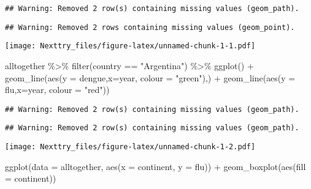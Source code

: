 \documentclass[
]{book}
\newenvironment{Shaded}{\begin{snugshade}}{\end{snugshade}}
\newcommand{\AttributeTok}[1]{\textcolor[rgb]{0.77,0.63,0.00}{#1}}
\newcommand{\FunctionTok}[1]{\textcolor[rgb]{0.00,0.00,0.00}{#1}}
\newcommand{\NormalTok}[1]{#1}
\newcommand{\SpecialCharTok}[1]{\textcolor[rgb]{0.00,0.00,0.00}{#1}}
\newcommand{\StringTok}[1]{\textcolor[rgb]{0.31,0.60,0.02}{#1}}
\begin{document}
\begin{verbatim}
## Warning: Removed 2 row(s) containing missing values (geom_path).
\end{verbatim}

\begin{verbatim}
## Warning: Removed 2 rows containing missing values (geom_point).
\end{verbatim}

\texttt{[image: Nexttry\_files/figure-latex/unnamed-chunk-1-1.pdf]}

\begin{Shaded}
\begin{Highlighting}[]
\NormalTok{alltogether }\SpecialCharTok{\%\textgreater{}\%} \FunctionTok{filter}\NormalTok{(country }\SpecialCharTok{==} \StringTok{"Argentina"}\NormalTok{) }\SpecialCharTok{\%\textgreater{}\%}
  \FunctionTok{ggplot}\NormalTok{() }\SpecialCharTok{+} 
  \FunctionTok{geom\_line}\NormalTok{(}\FunctionTok{aes}\NormalTok{(}\AttributeTok{y =}\NormalTok{ dengue,}\AttributeTok{x=}\NormalTok{year, }\AttributeTok{colour =} \StringTok{"green"}\NormalTok{),) }\SpecialCharTok{+} 
  \FunctionTok{geom\_line}\NormalTok{(}\FunctionTok{aes}\NormalTok{(}\AttributeTok{y =}\NormalTok{ flu,}\AttributeTok{x=}\NormalTok{year, }\AttributeTok{colour =} \StringTok{"red"}\NormalTok{))}
\end{Highlighting}
\end{Shaded}

\begin{verbatim}
## Warning: Removed 2 row(s) containing missing values (geom_path).
\end{verbatim}

\begin{verbatim}
## Warning: Removed 2 row(s) containing missing values (geom_path).
\end{verbatim}

\texttt{[image: Nexttry\_files/figure-latex/unnamed-chunk-1-2.pdf]}

\begin{Shaded}
\begin{Highlighting}[]
\FunctionTok{ggplot}\NormalTok{(}\AttributeTok{data =}\NormalTok{ alltogether, }\FunctionTok{aes}\NormalTok{(}\AttributeTok{x =}\NormalTok{ continent, }\AttributeTok{y =}\NormalTok{ flu)) }\SpecialCharTok{+}
  \FunctionTok{geom\_boxplot}\NormalTok{(}\FunctionTok{aes}\NormalTok{(}\AttributeTok{fill =}\NormalTok{ continent))}
\end{Highlighting}
\end{Shaded}
\end{document}
